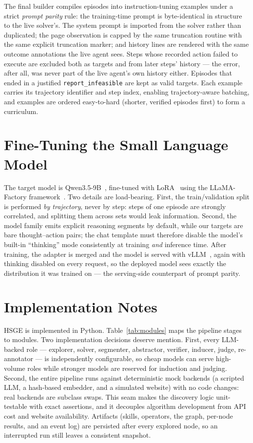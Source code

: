 The final builder compiles episodes into instruction-tuning examples under a
strict \emph{prompt parity} rule: the training-time prompt is byte-identical
in structure to the live solver's. The system prompt is imported from the
solver rather than duplicated; the page observation is capped by the same
truncation routine with the same explicit truncation marker; and history
lines are rendered with the same outcome annotations the live agent sees.
Steps whose recorded action failed to execute are excluded both as targets
and from later steps' history --- the error, after all, was never part of the
live agent's own history either. Episodes that ended in a justified
\texttt{report\_infeasible} are kept as valid targets. Each example carries
its trajectory identifier and step index, enabling trajectory-aware batching,
and examples are ordered easy-to-hard (shorter, verified episodes first) to
form a curriculum.

\section{Fine-Tuning the Small Language Model}
\label{sec:method-sft}

The target model is Qwen3.5-9B~\cite{yang2025qwen3}, fine-tuned with
LoRA~\cite{hu2022lora} using the LLaMA-Factory
framework~\cite{zheng2024llamafactory}. Two details are load-bearing. First,
the train/validation split is performed \emph{by trajectory}, never by step:
steps of one episode are strongly correlated, and splitting them across sets
would leak information. Second, the model family emits explicit reasoning
segments by default, while our targets are bare thought--action pairs; the
chat template must therefore disable the model's built-in ``thinking'' mode
consistently at training \emph{and} inference time. After training, the
adapter is merged and the model is served with vLLM~\cite{kwon2023vllm},
again with thinking disabled on every request, so the deployed model sees
exactly the distribution it was trained on --- the serving-side counterpart
of prompt parity.

\section{Implementation Notes}
\label{sec:method-impl}

HSGE is implemented in Python. Table~\ref{tab:modules} maps the pipeline
stages to modules. Two implementation decisions deserve mention. First, every
LLM-backed role --- explorer, solver, segmenter, abstractor, verifier,
inducer, judge, re-annotator --- is independently configurable, so cheap
models can serve high-volume roles while stronger models are reserved for
induction and judging. Second, the entire pipeline runs against deterministic
mock backends (a scripted LLM, a hash-based embedder, and a simulated
website) with no code changes: real backends are subclass swaps. This seam
makes the discovery logic unit-testable with exact assertions, and it
decouples algorithm development from API cost and website availability.
Artifacts (skills, operators, the graph, per-node results, and an event log)
are persisted after every explored node, so an interrupted run still leaves a
consistent snapshot.

